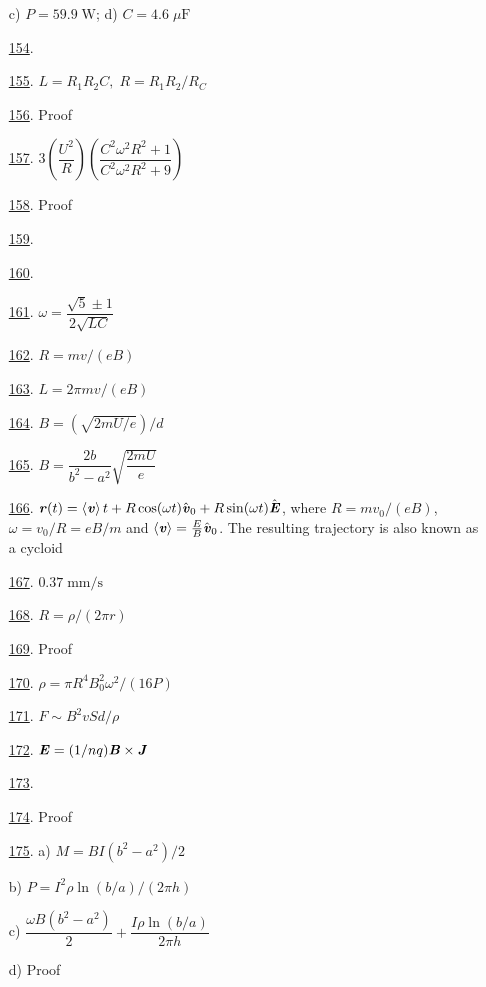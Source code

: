 \documentclass[11pt]{article}
\begin{document}
\begin{multicols}{2}
\begin{enumerate}
	c) $P=59.9\;\text{W}$; d) $C=4.6\;\mu\text{F}$ %
	\item [\hyperlink{P154}{154}.]  %
	\item [\hyperlink{P155}{155}.] $L=R_1R_2C,\;R=R_1R_2/R_C$ %
	\item [\hyperlink{P156}{156}.] Proof %
	\item [\hyperlink{P157}{157}.] $3\left(\dfrac{U^2}{R}\right)\left(\dfrac{C^2\omega^2R^2+1}{C^2\omega^2R^2+9}\right)$ %
	\item [\hyperlink{P158}{158}.] Proof %
	\item [\hyperlink{P159}{159}.]  %
	\item [\hyperlink{P160}{160}.]  %
	\item [\hyperlink{P161}{161}.] $\omega=\dfrac{\sqrt{5}\pm1}{2\sqrt{LC}}$ %
	\item [\hyperlink{P162}{162}.] $R=mv/(eB)$ %
	\item [\hyperlink{P163}{163}.] $L=2\pi mv/(eB)$ %
	\item [\hyperlink{P164}{164}.] $B=(\sqrt{2mU/e})/d$ %
	\item [\hyperlink{P165}{165}.] $B=\dfrac{2b}{b^2-a^2}\sqrt{\dfrac{2mU}{e}}$ %
	\item [\hyperlink{P166}{166}.] $\textbf{\textit{r}}(t)=\left<\textbf{\textit{v}}\right>t+R\cos(\omega t)\hat{\textbf{\textit{v}}}_0+R\sin(\omega t)\hat{\textbf{\textit{E}}}$, where $R=mv_0/(eB)$, $\omega=v_0/R=eB/m$ and $\left<\textbf{\textit{v}}\right>=\frac{E}{B}\hat{\textbf{\textit{v}}}_0$. The resulting trajectory is also known as a cycloid %
	\item [\hyperlink{P167}{167}.] $0.37\;\text{mm}/\text{s}$ %
	\item [\hyperlink{P168}{168}.] $R=\rho/(2\pi r)$ %
	\item [\hyperlink{P169}{169}.] Proof %
	\item [\hyperlink{P170}{170}.] $\rho=\pi R^4B_0^2\omega^2/(16P)$ %
	\item [\hyperlink{P171}{171}.] $F\sim B^2vSd/\rho$ %
	\item [\hyperlink{P172}{172}.] $\textbf{\textit{E}}=(1/nq)\textbf{\textit{B}}\times\textbf{\textit{J}}$ %
	\item [\hyperlink{P173}{173}.]  %
	\item [\hyperlink{P174}{174}.] Proof %
	\item [\hyperlink{P175}{175}.] a) $M=BI(b^2-a^2)/2$
	
	b) $P=I^2\rho\ln(b/a)/(2\pi h)$
	
	c) $\dfrac{\omega B(b^2-a^2)}{2}+\dfrac{I\rho\ln(b/a)}{2\pi h}$
	
	d) Proof %
\end{enumerate}
\end{multicols}
\end{document}
